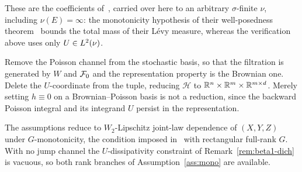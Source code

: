 \begin{example}
These are the coefficients of~\cite[Example~3.1]{LiMin}, carried over here to an
arbitrary $\sigma$-finite $\nu$, including $\nu(E)=\infty$: the monotonicity hypothesis of
their well-posedness theorem~\cite[(H3.2) and Theorem~3.1]{LiMin} bounds the total mass of
their L\'evy measure, whereas the verification above uses only $U\in L^2(\nu)$.

\end{example}

\begin{example}\label{ex:brownian}
Remove the Poisson channel from the stochastic basis, so that the filtration is generated by
$W$ and $\mathcal{F}_0$ and the representation property is the Brownian one. Delete the $U$-coordinate
from the tuple, reducing $\mathcal H$ to $\mathbb{R}^n\times\mathbb{R}^m\times\mathbb{R}^{m\times d}$. Merely setting
$h\equiv0$ on a Brownian--Poisson basis is not a reduction, since the backward Poisson integral
and its integrand $U$ persist in the representation.

The assumptions reduce to $W_2$-Lipschitz joint-law dependence of $(X,Y,Z)$ under
$G$-monotonicity, the condition imposed in~\cite[(A1)]{BYZ} with rectangular full-rank $G$.
With no jump channel the $U$-dissipativity constraint of
Remark~\ref{rem:beta1-dich} is vacuous, so both rank branches of Assumption~\ref{ass:mono}
are available.
\end{example}


